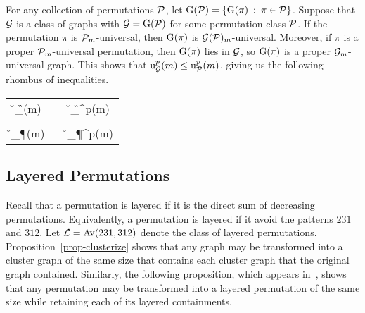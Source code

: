 For any collection of permutations $\P$, let $\g(\P) = \{\g(\pi) \st \pi \in \P\}$. Suppose that $\G$ is a class of graphs with $\G = \g(\P)$ for some permutation class $\P$. If the permutation $\pi$ is $\P_m$-universal, then $\g(\pi)$ is $\G(\P)_m$-universal. Moreover, if $\pi$ is a proper $\P_m$-universal permutation, then $\g(\pi)$ lies in $\G$, so $\g(\pi)$ is a proper $\G_m$-universal graph. This shows that $\u_\G^p(m) \le \u_\P^p(m)$, giving us the following rhombus of inequalities.

\begin{center}
\begin{tabular}{CCC}
	\u_{\G}(m) & \le & \u_{\G}^{p}(m) \\
	  \rotle   &     &     \rotle     \\
	\u_{\P}(m) & \le & \u_{\P}^{p}(m)
\end{tabular}
\end{center}

\subsection{Layered Permutations}
\label{sec-perm-layered}

Recall that a permutation is layered if it is the direct sum of decreasing permutations. Equivalently, a permutation is layered if it avoid the patterns $231$ and $312$. Let $\Lay = \Av(231,312)$ denote the class of layered permutations. Proposition~\ref{prop-clusterize} shows that any graph may be transformed into a cluster graph of the same size that contains each cluster graph that the original graph contained. Similarly, the following proposition, which appears in~\cite{albert:universal-layer:}, shows that any permutation may be transformed into a layered permutation of the same size while retaining each of its layered containments.

